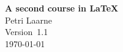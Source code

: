 \documentclass[a4paper, 11pt]{report}
\begin{document}
\begin{titlepage}

\hrulefill

\begin{flushright}
\textbf{\LARGE A second course in \LaTeX}\\[1em]
\Large Petri Laarne\\[1em]
Version~1.1\\
\today
\end{flushright}

\hrulefill

\end{titlepage}

\tableofcontents













\printindex
\printbibliography[heading=bibintoc]


\end{document}
